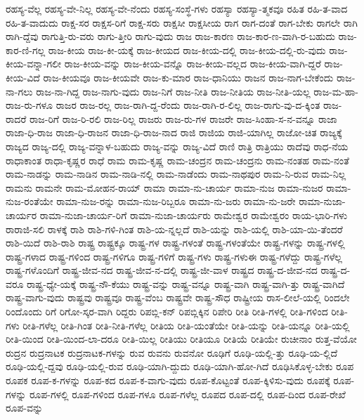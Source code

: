 {ರಹಸ್ಯ-ವೆಲ್ಲ
ರಹಸ್ಯ-ವೇ-ನಿಲ್ಲ
ರಹಸ್ಯ-ವೇ-ನೆಂದು
ರಹಸ್ಯ-ಸಂಸ್ಥೆ-ಗಳು
ರಹಸ್ಯಾ
ರಹಸ್ಯಾ-ತ್ಮಕವೂ
ರಹಿತ
ರಹಿ-ತ-ವಾದ
ರಹಿ-ತ-ವಾದುದು
ರಾಕ್ಷ-ಸರ
ರಾಕ್ಷಸ-ರಿಗೆ
ರಾಕ್ಷ-ಸರು
ರಾಕ್ಷಸೀ
ರಾಕ್ಷಸೀಯ
ರಾಗ
ರಾಗ-ದಂತೆ
ರಾಗ-ಬೇಕು
ರಾಗಲೇ
ರಾಗಿ
ರಾಗಿ-ದ್ದೆವು
ರಾಗುತ್ತಿ-ರು-ವರು
ರಾಗು-ತ್ತೀರಿ
ರಾಗು-ವುದು
ರಾಜ
ರಾಜ-ಕಾರಣ
ರಾಜ-ಕಾರ-ಣ-ವಾಗಿ-ರ-ಬಹುದು
ರಾಜ-ಕಾರ-ಣಿ-ಗಲ್ಲ
ರಾಜ-ಕೀಯ
ರಾಜ-ಕೀ-ಯಕ್ಕೆ
ರಾಜ-ಕೀಯದ
ರಾಜ-ಕೀಯ-ದಲ್ಲಿ
ರಾಜ-ಕೀಯ-ದಲ್ಲಿ-ರು-ವುದು
ರಾಜ-ಕೀಯ-ವನ್ನಾ-ಗಲೀ
ರಾಜ-ಕೀಯ-ವನ್ನು
ರಾಜ-ಕೀಯ-ವನ್ನೊ
ರಾಜ-ಕೀಯ-ವಲ್ಲದ
ರಾಜ-ಕೀಯ-ವಾಗಿ-ದ್ದರೆ
ರಾಜ-ಕೀಯ-ವಿದೆ
ರಾಜ-ಕೀಯವೂ
ರಾಜ-ಕೀಯವೇ
ರಾಜ-ಕು-ಮಾರ
ರಾಜ-ಧಾನಿಯು
ರಾಜನ
ರಾಜ-ನಾಗ-ಬೇಕೆಂದು
ರಾಜ-ನಾ-ಗಲು
ರಾಜ-ನಾ-ಗಿದ್ದ
ರಾಜ-ನಾಗು-ವುದು
ರಾಜ-ನಿಗೆ
ರಾಜ-ನೀತಿ
ರಾಜ-ನೀತಿಯ
ರಾಜ-ನೀತಿ-ಯಲ್ಲ
ರಾಜ-ಮ-ಹಾ-ರಾಜ-ರು-ಗಳೂ
ರಾಜರ
ರಾಜ-ರಲ್ಲ
ರಾಜ-ರಾಗಿ-ದ್ದ-ರೆಂದು
ರಾಜ-ರಾಗಿ-ರ-ಲಿಲ್ಲ
ರಾಜ-ರಾಗು-ವು-ದ-ಕ್ಕಿಂತ
ರಾಜ-ರಾದರೆ
ರಾಜ-ರಿಗೆ
ರಾಜ-ರಿ-ರಲಿ
ರಾಜ-ರಿಲ್ಲ
ರಾಜರು
ರಾಜ-ರು-ಗಳ
ರಾಜರೇ
ರಾಜ-ಸಿಂಹಾ-ಸ-ನ-ವನ್ನೂ
ರಾಜಾ
ರಾಜಾ-ಧಿ-ರಾಜ
ರಾಜಾ-ಧಿ-ರಾಜನ
ರಾಜಾ-ಧಿ-ರಾಜ-ನಾದ
ರಾಜಿ
ರಾಜಿಯ
ರಾಜಿ-ಯಾಗಿಲ್ಲ
ರಾಜೋ-ಚಿತ
ರಾಜ್ಯಕ್ಕೆ
ರಾಜ್ಯದ
ರಾಜ್ಯ-ದಲ್ಲಿ
ರಾಜ್ಯ-ವನ್ನಾಳ-ಬಹುದು
ರಾಜ್ಯ-ವನ್ನು
ರಾಜ್ಯ-ವಿದೆ
ರಾಣಿ
ರಾತ್ರಿ
ರಾತ್ರಿಯು
ರಾದೆವು
ರಾಧ-ನೆಯ
ರಾಧಾಕಾಂತ
ರಾಧಾ-ಕೃಷ್ಣರ
ರಾಧೆ
ರಾಮ
ರಾಮ-ಕೃಷ್ಣ
ರಾಮ-ಚಂದ್ರನ
ರಾಮ-ಚಂದ್ರನು
ರಾಮ-ನಂತಹ
ರಾಮ-ನಂತೆ
ರಾಮ-ನಾಡನ್ನು
ರಾಮ-ನಾಡಿನ
ರಾಮ-ನಾಡಿ-ನಲ್ಲಿ
ರಾಮ-ನಾಡೆಂದು
ರಾಮ-ನಾಥಪುರ
ರಾಮ-ನಿ-ರುವ
ರಾಮ-ನಿಲ್ಲ
ರಾಮನು
ರಾಮನೇ
ರಾಮ-ಮೋಹನ-ರಾಯ್
ರಾಮಾ
ರಾಮಾ-ನು-ಚಾರ್ಯ
ರಾಮಾ-ನುಜ
ರಾಮಾ-ನುಜರ
ರಾಮಾ-ನುಜ-ರಂತೆಯೇ
ರಾಮಾ-ನುಜ-ರನ್ನು
ರಾಮಾ-ನುಜ-ರಿಬ್ಬರೂ
ರಾಮಾ-ನು-ಜರು
ರಾಮಾ-ನು-ಜರೇ
ರಾಮಾ-ನುಜಾ-ಚಾರ್ಯರ
ರಾಮಾ-ನುಜಾ-ಚಾರ್ಯ-ರಿಗೆ
ರಾಮಾ-ನುಜಾ-ಚಾರ್ಯರು
ರಾಮೇಶ್ವರ
ರಾಮೇಶ್ವರಂ
ರಾಯ-ಭಾರಿ-ಗಳು
ರಾರಾಜಿ-ಸಲಿ
ರಾಳಕ್ಕೆ
ರಾಶಿ
ರಾಶಿ-ಗಳಿ-ಗಿಂತ
ರಾಶಿ-ಯ-ನ್ನಲ್ಲದೆ
ರಾಶಿ-ಯನ್ನು
ರಾಶಿ-ಯಲ್ಲಿ
ರಾಶಿ-ಯಾ-ಯಿ-ತೆಂದರೆ
ರಾಶಿ-ಯಿದೆ
ರಾಶಿ-ರಾಶಿ
ರಾಷ್ಟ್ರ
ರಾಷ್ಟ್ರಕ್ಕೂ
ರಾಷ್ಟ್ರ-ಗಳ
ರಾಷ್ಟ್ರ-ಗಳಂತೆ
ರಾಷ್ಟ್ರ-ಗಳಂತೆಯೇ
ರಾಷ್ಟ್ರ-ಗಳನ್ನು
ರಾಷ್ಟ್ರ-ಗಳಲ್ಲಿ
ರಾಷ್ಟ್ರ-ಗಳಾದ
ರಾಷ್ಟ್ರ-ಗಳಿಂದ
ರಾಷ್ಟ್ರ-ಗಳಿಗೂ
ರಾಷ್ಟ್ರ-ಗಳಿಗೆ
ರಾಷ್ಟ್ರ-ಗಳು
ರಾಷ್ಟ್ರ-ಗಳುಈ
ರಾಷ್ಟ್ರ-ಗಳೆದ್ದು
ರಾಷ್ಟ್ರ-ಗಳೆಲ್ಲ
ರಾಷ್ಟ್ರ-ಗಳೊಂದಿಗೆ
ರಾಷ್ಟ್ರ-ಜೀವ-ನದ
ರಾಷ್ಟ್ರ-ಜೀವ-ನ-ದಲ್ಲಿ
ರಾಷ್ಟ್ರ-ಜೀ-ವಾಳ
ರಾಷ್ಟ್ರದ
ರಾಷ್ಟ್ರ-ದ-ಜೀವ-ನದ
ರಾಷ್ಟ್ರ-ದ-ವರೂ
ರಾಷ್ಟ್ರ-ಧ್ಯೇ-ಯಕ್ಕೆ
ರಾಷ್ಟ್ರ-ನೌ-ಕೆಯು
ರಾಷ್ಟ್ರ-ವನ್ನು
ರಾಷ್ಟ್ರ-ವನ್ನೂ
ರಾಷ್ಟ್ರ-ವಾಗಿ
ರಾಷ್ಟ್ರ-ವಾಗಿ-ತ್ತು
ರಾಷ್ಟ್ರ-ವಾಗಿದೆ
ರಾಷ್ಟ್ರ-ವಾಗು-ವುದು
ರಾಷ್ಟ್ರವು
ರಾಷ್ಟ್ರವೂ
ರಾಷ್ಟ್ರ-ವೆಂಬ
ರಾಷ್ಟ್ರವೇ
ರಾಷ್ಟ್ರ-ಸೌಧ
ರಾಷ್ಟ್ರೀಯ
ರಾಸ-ಲೀಲೆ-ಯಲ್ಲಿ
ರಿಂದಲೇ
ರಿಂದೊಂದು
ರಿಗೆ
ರಿಗೋ-ಸ್ಕರ-ವಾಗಿ
ರಿದ್ದರು
ರಿಪಬ್ಲಿ-ಕನ್
ರಿಪಬ್ಲಿಕ್ಕಿನ
ರಿಪೇರಿ
ರೀತಿ
ರೀತಿ-ಗಳಲ್ಲಿ
ರೀತಿ-ಗಳಿಂದ
ರೀತಿ-ಗಳು
ರೀತಿ-ಗಳೆಲ್ಲ
ರೀತಿ-ಗಿಂತ
ರೀತಿ-ನೀತಿ-ಗಳೆಲ್ಲ
ರೀತಿಯ
ರೀತಿ-ಯಂತೆಯೇ
ರೀತಿ-ಯನ್ನು
ರೀತಿ-ಯನ್ನೂ
ರೀತಿ-ಯಲ್ಲಿ
ರೀತಿ-ಯಿಂದ
ರೀತಿ-ಯಿಂದ-ಲಾ-ದರೂ
ರೀತಿ-ಯಿಲ್ಲ
ರೀತಿಯು
ರೀತಿಯೂ
ರೀತಿಯೆ
ರೀತಿಯೇ
ರುಚೀನಾಂ
ರುತ್ತ-ವೆಯೋ
ರುದ್ರನ
ರುದ್ರನಾಟಕ
ರುದ್ರನಾಟಕ-ಗಳನ್ನು
ರುವ
ರುವನು
ರುವನೋ
ರೂಢಿಗೆ
ರೂಢಿ-ಯಲ್ಲಿ-ತ್ತು
ರೂಢಿ-ಯ-ಲ್ಲಿದೆ
ರೂಢಿ-ಯಲ್ಲಿ-ದ್ದವು
ರೂಢಿ-ಯಲ್ಲಿ-ರುವ
ರೂಢಿ-ಯಾಗಿ-ದ್ದುದು
ರೂಢಿ-ಯಾಗಿ-ಹೋ-ಗಿದೆ
ರೂಢಿಸಿಕೊಳ್ಳ-ಬೇಕು
ರೂಪ
ರೂಪಕ
ರೂಪ-ಕ-ಗಳನ್ನು
ರೂಪ-ಕದ
ರೂಪ-ಕ-ವಾಗು-ವುದು
ರೂಪ-ಕೊಟ್ಟಂತೆ
ರೂಪ-ಕ್ಕಿಳಿಸು-ವುದು
ರೂಪಕ್ಕೆ
ರೂಪ-ಗಳನ್ನು
ರೂಪ-ಗಳಲ್ಲಿ
ರೂಪ-ಗಳಿಂದ
ರೂಪ-ಗಳೂ
ರೂಪ-ಗಳೆಲ್ಲ
ರೂಪದ
ರೂಪ-ದಲ್ಲಿ
ರೂಪ-ದಿಂದ
ರೂಪ-ರೇಖೆ
ರೂಪ-ವನ್ನು
}
